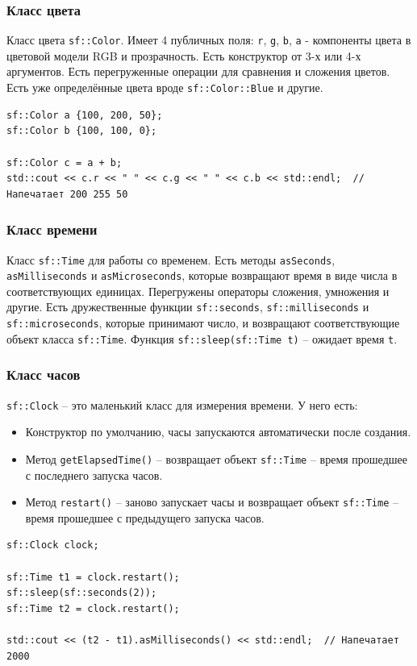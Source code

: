 \documentclass{article}
\begin{document}
\subsubsection*{Класс цвета}
Класс цвета \texttt{sf::Color}. Имеет 4 публичных поля: \texttt{r}, \texttt{g}, \texttt{b}, \texttt{a} - компоненты цвета в цветовой модели RGB и прозрачность. Есть конструктор от 3-х или 4-х аргументов. Есть перегруженные операции для сравнения и сложения цветов. Есть уже определённые цвета вроде \texttt{sf::Color::Blue} и другие.

\begin{lstlisting}
sf::Color a {100, 200, 50};
sf::Color b {100, 100, 0};

sf::Color c = a + b;
std::cout << c.r << " " << c.g << " " << c.b << std::endl;  // Напечатает 200 255 50
\end{lstlisting}



\subsubsection*{Класс времени}
Класс \texttt{sf::Time} для работы со временем. Есть методы \texttt{asSeconds}, \texttt{asMilliseconds} и \texttt{asMicroseconds}, которые возвращают время в виде числа в соответствующих единицах. Перегружены операторы сложения, умножения и другие. Есть дружественные функции \texttt{sf::seconds}, \texttt{sf::milliseconds} и \texttt{sf::microseconds}, которые принимают число, и возвращают соответствующие объект класса \texttt{sf::Time}. Функция \texttt{sf::sleep(sf::Time t)} -- ожидает время \texttt{t}.

\subsubsection*{Класс часов}
\texttt{sf::Clock} -- это маленький класс для измерения времени. У него есть:
\begin{itemize}
\item Конструктор по умолчанию, часы запускаются автоматически после создания.
\item Метод \texttt{getElapsedTime()} -- возвращает объект \texttt{sf::Time} -- время прошедшее с последнего запуска часов.
\item Метод \texttt{restart()} -- заново запускает часы и возвращает объект \texttt{sf::Time} -- время прошедшее с предыдущего запуска часов.
\end{itemize}

\begin{lstlisting}
sf::Clock clock;

sf::Time t1 = clock.restart();
sf::sleep(sf::seconds(2));
sf::Time t2 = clock.restart();
    
std::cout << (t2 - t1).asMilliseconds() << std::endl;  // Напечатает 2000
\end{lstlisting}
\end{document}
